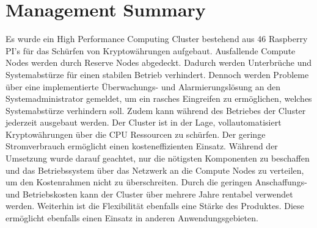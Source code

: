 \section*{Management Summary}
Es wurde ein High Performance Computing Cluster bestehend aus 46 Raspberry PI's für das Schürfen von Kryptowährungen aufgebaut. Ausfallende Compute Nodes werden durch Reserve Nodes abgedeckt. Dadurch werden Unterbrüche und Systemabstürze für einen stabilen Betrieb verhindert. Dennoch werden Probleme über eine implementierte Überwachungs- und Alarmierungslösung an den Systemadministrator gemeldet, um ein rasches Eingreifen zu ermöglichen, welches Systemabstürze verhindern soll. Zudem kann während des Betriebes der Cluster jederzeit ausgebaut werden. Der Cluster ist in der Lage, vollautomatisiert Kryptowährungen über die CPU Ressourcen zu schürfen. Der geringe Stromverbrauch ermöglicht einen kosteneffizienten Einsatz. Während der Umsetzung wurde darauf geachtet, nur die nötigsten Komponenten zu beschaffen und das Betriebssystem über das Netzwerk an die Compute Nodes zu verteilen, um den Kostenrahmen nicht zu überschreiten. Durch die geringen Anschaffungs- und Betriebskosten kann der Cluster über mehrere Jahre rentabel verwendet werden. Weiterhin ist die Flexibilität ebenfalls eine Stärke des Produktes. Diese ermöglicht ebenfalls einen Einsatz in anderen Anwendungsgebieten.